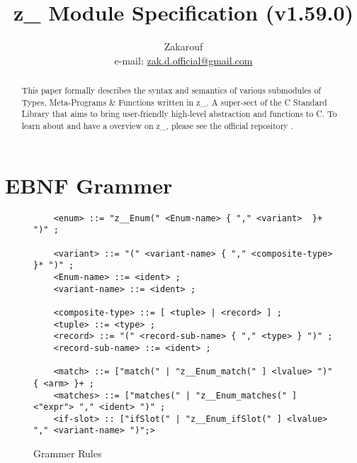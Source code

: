 \documentclass[12pt]{article}
\theoremstyle{break}
\begin{document}
\title{z\_ Module Specification (v1.59.0)}
\data{\today}
\author{Zakarouf \\ e-mail: \href{mailto:zak.d.official@gmail.com}{zak.d.official@gmail.com}}
\maketitle

\begin{abstract}
    This paper formally describes the syntax and semantics of various submodules of Types, Meta-Programs & Functions written in z\_. A super-sect of the C Standard Library that aims to bring user-friendly high-level abstraction and functions to C. To learn about and have a overview on z\_, please see the official repository \cite{z_}.
\end{abstract}

\tableofcontents

\newpage

\section{EBNF Grammer}
\begin{figure}[H]
    \caption{Grammer Rules}

\begin{verbatim}
    <enum> ::= "z__Enum(" <Enum-name> { "," <variant>  }+ ")" ;

    <variant> ::= "(" <variant-name> { "," <composite-type> }* ")" ;
    <Enum-name> ::= <ident> ;
    <variant-name> ::= <ident> ;

    <composite-type> ::= [ <tuple> | <record> ] ;
    <tuple> ::= <type> ;
    <record> ::= "(" <record-sub-name> { "," <type> } ")" ;
    <record-sub-name> ::= <ident> ;

    <match> ::= ["match(" | "z__Enum_match(" ] <lvalue> ")" { <arm> }+ ;
    <matches> ::= ["matches(" | "z__Enum_matches(" ] <"expr"> "," <ident> ")" ;
    <if-slot> :: ["ifSlot(" | "z__Enum_ifSlot(" ] <lvalue> "," <variant-name> ")";>
\end{verbatim}
\end{figure}
\end{document}
